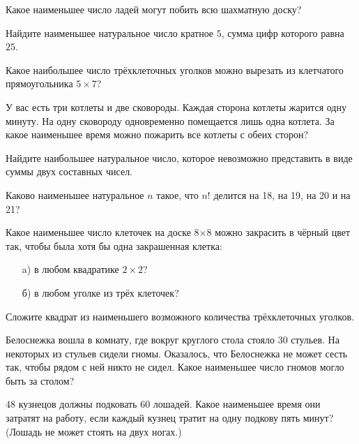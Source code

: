 \documentclass{article}
\begin{document}
    \begin{enumerate_boxed}
        \item Какое наименьшее число ладей могут побить всю шахматную доску?

        \item Найдите наименьшее натуральное число кратное $5$, сумма цифр которого равна $25$.

        \item Какое наибольшее число трёхклеточных уголков можно вырезать из клетчатого прямоугольника $5 \times 7$?

        \item У вас есть три котлеты и две сковороды.
        Каждая сторона котлеты жарится одну минуту.
        На одну сковороду одновременно помещается лишь одна котлета.
        За какое наименьшее время можно пожарить все котлеты с обеих сторон?

        \item Найдите наибольшее натуральное число, которое невозможно представить в виде суммы двух составных чисел.

        \item Каково наименьшее натуральное $n$ такое, что $n!$ делится на 18, на 19, на 20 и на 21?

        \item Какое наименьшее число клеточек на доске 8×8 можно закрасить в чёрный цвет так, чтобы была хотя бы одна закрашенная клетка:

        \begin{enumerate}
            \item[a)] в любом квадратике $2\times2$?
            \item[б)] в любом уголке из трёх клеточек?
        \end{enumerate}

        \item Сложите квадрат из наименьшего возможного количества трёхклеточных уголков.

        \item Белоснежка вошла в комнату, где вокруг круглого стола стояло 30 стульев.
        На некоторых из стульев сидели гномы.
        Оказалось, что Белоснежка не может сесть так, чтобы рядом с ней никто не сидел.
        Какое наименьшее число гномов могло быть за столом?

        \item $48$ кузнецов должны подковать $60$ лошадей.
        Какое наименьшее время они затратят на работу, если каждый кузнец тратит на одну подкову пять минут?
        (Лошадь не может стоять на двух ногах.)


\end{enumerate_boxed}
\end{document}
